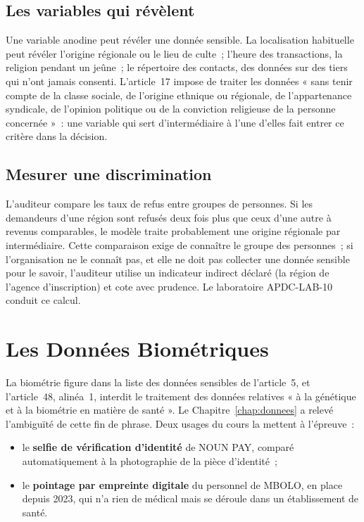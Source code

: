 \subsection{Les variables qui révèlent}

Une variable anodine peut révéler une donnée sensible. La localisation
habituelle peut révéler l'origine régionale ou le lieu de culte~; l'heure
des transactions, la religion pendant un jeûne~; le répertoire des
contacts, des données sur des tiers qui n'ont jamais consenti. L'article~17
impose de traiter les données « sans tenir compte de la classe sociale,
de l'origine ethnique ou régionale, de l'appartenance syndicale, de
l'opinion politique ou de la conviction religieuse de la personne
concernée »~: une variable qui sert
d'intermédiaire à l'une d'elles fait entrer ce critère dans la décision.

\subsection{Mesurer une discrimination}

L'auditeur compare les taux de refus entre groupes de personnes. Si les
demandeurs d'une région sont refusés deux fois plus que ceux d'une autre à
revenus comparables, le modèle traite probablement une origine régionale
par intermédiaire. Cette comparaison exige de connaître le groupe des
personnes~; si l'organisation ne le connaît pas, et elle ne doit pas
collecter une donnée sensible pour le savoir, l'auditeur utilise un
indicateur indirect déclaré (la région de l'agence d'inscription) et cote
avec prudence. Le laboratoire APDC-LAB-10 conduit ce calcul.

\section{Les Données Biométriques}
\label{sec:c14-biometrie}

La biométrie figure dans la liste des données sensibles de l'article~5, et
l'article~48, alinéa~1, interdit le traitement des données relatives
« à la génétique et à la biométrie en matière de santé ». Le
Chapitre~\ref{chap:donnees} a relevé l'ambiguïté de cette fin de phrase.
Deux usages du cours la mettent à l'épreuve~:

\begin{itemize}
    \item le \textbf{selfie de vérification d'identité} de NOUN PAY, comparé
          automatiquement à la photographie de la pièce d'identité~;
    \item le \textbf{pointage par empreinte digitale} du personnel de MBOLO,
          en place depuis 2023, qui n'a rien de médical mais se déroule dans
          un établissement de santé.
\end{itemize}

